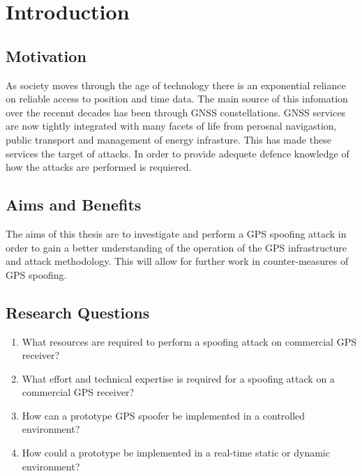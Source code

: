 
\chapter{Introduction}\label{chapter:firstchapter} %

\label{Chapter1} %

\section{Motivation}\label{sec:Motivation}


As society moves through the age of technology there is an exponential reliance on reliable access to position and time data. The main source of this infomation over the
recennt decades has been through GNSS constellations. GNSS services are now tightly integrated with many facets of life from perosnal navigastion, public transport and
management of
energy infrasture. This has made these services the target of attacks. In order to provide adequete defence knowledge of how the attacks are performed is requiered.

\section{Aims and Benefits}\label{sec:Aims}
The aims of this thesis are to investigate and perform a GPS spoofing attack in order to gain a better understanding of the operation of the GPS infrastructure and attack
methodology. This will allow for further work in counter-measures of GPS spoofing.

\section{Research Questions}\label{sec:RQs}
\begin{enumerate}
    \item What resources are required to perform a spoofing attack on commercial GPS receiver?
    \item What effort and technical expertise is required for a spoofing attack on a commercial GPS receiver?
    \item How can a prototype GPS spoofer be implemented in a controlled environment?
    \item How could a prototype be implemented in a real-time static or dynamic environment? 
\end{enumerate}

